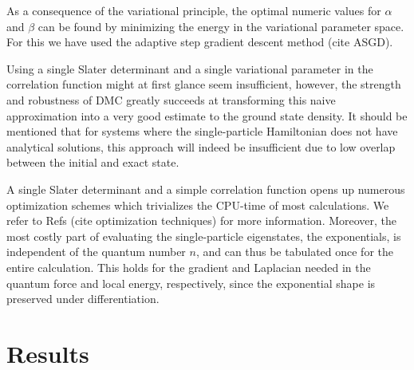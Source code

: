 \documentclass[amsmath, amssymb, aps, floatfix, nofootinbib, preprintnumbers,showpacs, superscriptaddress, twocolumn]{revtex4-1}
\begin{document}
As a consequence of the variational principle, the optimal numeric values for $\alpha$ and $\beta$ can be found by minimizing the energy in the variational parameter space.
For this we have used the adaptive step gradient descent method (cite ASGD).

Using a single Slater determinant and a single variational parameter in the correlation function might at first glance seem insufficient,
however, the strength and robustness of DMC greatly succeeds at transforming this naive approximation into a very good estimate to the ground
state density. It should be mentioned that for systems where the single-particle Hamiltonian does not have analytical solutions, this approach
will indeed be insufficient due to low overlap between the initial and exact state.

A single Slater determinant and a simple correlation function opens up numerous optimization schemes which trivializes the CPU-time of most calculations.
We refer to Refs (cite optimization techniques) for more information.
Moreover, the most costly part of evaluating the single-particle eigenstates, the exponentials, is independent of the quantum number $n$, and can thus be tabulated once
for the entire calculation. This holds for the gradient and Laplacian needed in the quantum force and local energy, respectively, since the exponential shape is
preserved under differentiation.



\section{Results}
\label{sec:results}
\end{document}
